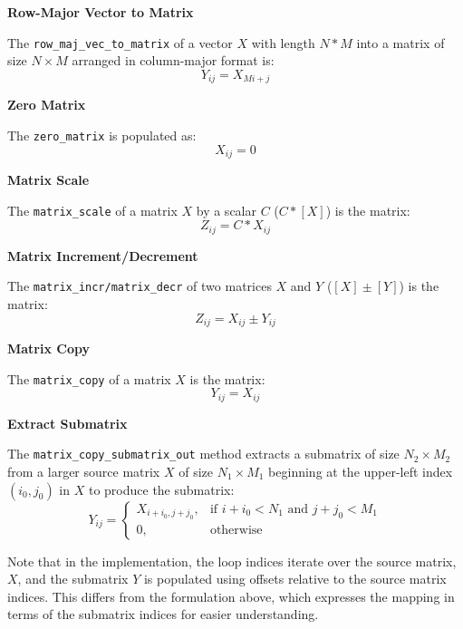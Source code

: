 \documentclass[11pt,fleqn]{report}
\begin{document}
\textbf{Row-Major Vector to Matrix}

The \texttt{row\_maj\_vec\_to\_matrix} of a vector $X$ with length
$N*M$ into a matrix of size $N \times M$ arranged in column-major format is:
\begin{equation*} 
Y_{ij} = X_{Mi + j}
\end{equation*}

\textbf{Zero Matrix}

The \texttt{zero\_matrix} is populated as:
\begin{equation*}
X_{ij} = 0
\end{equation*}

\textbf{Matrix Scale}

The \texttt{matrix\_scale} of a matrix $X$ by a scalar $C$ ($C*[X]$) is the matrix:
\begin{equation*}
Z_{ij} = C * X_{ij}
\end{equation*}

\textbf{Matrix Increment/Decrement}

The \texttt{matrix\_incr/matrix\_decr} of two matrices $X$ and $Y$ ($[X] \pm [Y]$) is
the matrix:
\begin{equation*}
Z_{ij} = X_{ij} \pm Y_{ij}
\end{equation*}

\textbf{Matrix Copy}

The \texttt{matrix\_copy} of a matrix $X$ is the matrix:
\begin{equation*}
Y_{ij} = X_{ij}
\end{equation*}

\textbf{Extract Submatrix}

The \texttt{matrix\_copy\_submatrix\_out} method extracts a submatrix of size
$N_2 \times M_2$ from a larger source matrix $X$ of size 
$N_1 \times M_1$ beginning at the upper-left index $(i_0,j_0)$ in $X$ to produce
the submatrix:
\begin{equation*}
Y_{ij} = 
\begin{cases}
X_{i+i_0, j+j_0}, & \text{if } i + i_0 < N_1 \text{ and } j + j_0 < M_1 \\
0, & \text{otherwise}
\end{cases}
\end{equation*}

Note that in the implementation, the loop indices iterate over the source matrix, $X$,
and the submatrix $Y$ is populated using offsets relative to the source matrix 
indices. This differs from the formulation above, which expresses the mapping 
in terms of the submatrix indices for easier understanding.
\end{document}
